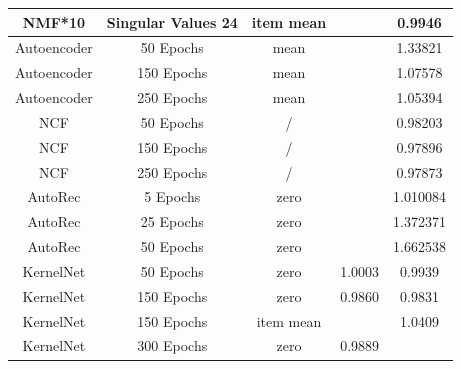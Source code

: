\documentclass[10pt,conference,compsocconf]{IEEEtran}
\begin{document}
\begin{table}
{\begin{tabular}{|| c | c | c | c | c ||}
                NMF*10            & Singular Values 24                & item mean               &                        & 0.9946                  \\
                \hline
                Autoencoder       & 50 Epochs                         & mean                    &                        & 1.33821                 \\
                Autoencoder       & 150 Epochs                        & mean                    &                        & 1.07578                 \\
                Autoencoder       & 250 Epochs                        & mean                    &                        & 1.05394                 \\
                \hline
                NCF               & 50 Epochs                         & /                       &                        & 0.98203                 \\
                NCF               & 150 Epochs                        & /                       &                        & 0.97896                 \\
                NCF               & 250 Epochs                        & /                       &                        & 0.97873                 \\
                \hline
                AutoRec           & 5 Epochs                          & zero                    &                        & 1.010084                \\
                AutoRec           & 25 Epochs                         & zero                    &                        & 1.372371                \\
                AutoRec           & 50 Epochs                         & zero                    &                        & 1.662538                \\
                \hline
                KernelNet         & 50 Epochs                         & zero                    & 1.0003                 & 0.9939                  \\
                KernelNet         & 150 Epochs                        & zero                    & 0.9860                 & 0.9831                  \\
                KernelNet         & 150 Epochs                        & item mean               &                        & 1.0409                  \\
                KernelNet         & 300 Epochs                        & zero                    & 0.9889                 &                         \\

\end{tabular}}
\end{table}
\end{document}
